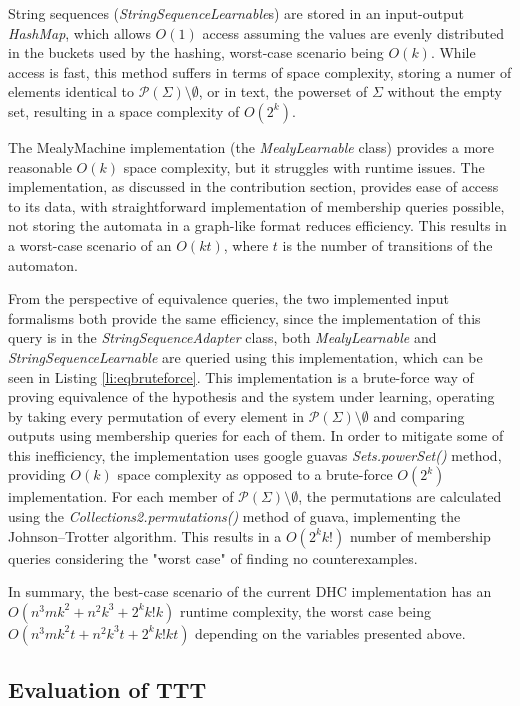 String sequences (\emph{StringSequenceLearnable}s) are stored in an input-output \emph{HashMap}, which allows $O(1)$ access assuming the values are evenly distributed in the buckets used by the hashing, worst-case scenario being $O(k)$. While access is fast, this method suffers in terms of space complexity, storing a numer of elements identical to $\mathcal{P}(\Sigma)\setminus\emptyset$, or in text, the powerset of $\Sigma$ without the empty set, resulting in a space complexity of $O(2^k)$.

The MealyMachine implementation (the \emph{MealyLearnable} class) provides a more reasonable $O(k)$ space complexity, but it struggles with runtime issues. The implementation, as discussed in the contribution section, provides ease of access to its data, with straightforward implementation of membership queries possible, not storing the automata in a graph-like format reduces efficiency. This results in a worst-case scenario of an $O(kt)$, where $t$ is the number of transitions of the automaton.

From the perspective of equivalence queries, the two implemented input formalisms both provide the same efficiency, since the implementation of this query is in the \emph{StringSequenceAdapter} class, both \emph{MealyLearnable} and \emph{StringSequenceLearnable} are queried using this implementation, which can be seen in Listing \ref{li:eqbruteforce}. This implementation is a brute-force way of proving equivalence of the hypothesis and the system under learning, operating by taking every permutation of every element in $\mathcal{P}(\Sigma)\setminus\emptyset$ and comparing outputs using membership queries for each of them. In order to mitigate some of this inefficiency, the implementation uses google guavas \emph{Sets.powerSet()} method, providing $O(k)$ space complexity as opposed to a brute-force $O(2^k)$ implementation. For each member of $\mathcal{P}(\Sigma)\setminus\emptyset$, the permutations are calculated using the \emph{Collections2.permutations()} method of guava, implementing the Johnson–Trotter algorithm. This results in a $O(2^kk!)$ number of membership queries considering the "worst case" of finding no counterexamples.

In summary, the best-case scenario of the current DHC implementation has an $O(n^3mk^2+n^2k^3+2^kk!k)$ runtime complexity, the worst case being $O(n^3mk^2t+n^2k^3t+2^kk!kt)$ depending on the variables presented above.

\subsection{Evaluation of TTT}

